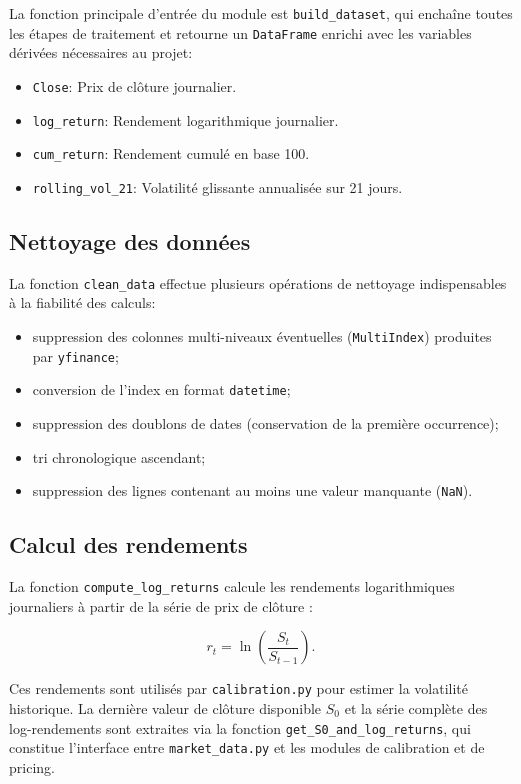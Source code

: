 \documentclass[11pt]{report}
\begin{document}
La fonction principale d'entrée du module est \texttt{build\_dataset}, qui enchaîne
toutes les étapes de traitement et retourne un \texttt{DataFrame} enrichi avec
les variables dérivées nécessaires au projet:

\begin{itemize}
    \item \texttt{Close}: Prix de clôture journalier.
    \item \texttt{log\_return}: Rendement logarithmique journalier.
    \item \texttt{cum\_return}: Rendement cumulé en base 100.
    \item \texttt{rolling\_vol\_21}: Volatilité glissante annualisée sur 21 jours.
\end{itemize}

\subsection{Nettoyage des données}

La fonction \texttt{clean\_data} effectue plusieurs opérations de nettoyage
indispensables à la fiabilité des calculs:

\begin{itemize}
    \item suppression des colonnes multi-niveaux éventuelles (\texttt{MultiIndex})
    produites par \texttt{yfinance};
    \item conversion de l'index en format \texttt{datetime};
    \item suppression des doublons de dates (conservation de la première occurrence);
    \item tri chronologique ascendant;
    \item suppression des lignes contenant au moins une valeur manquante (\texttt{NaN}).
\end{itemize}

\subsection{Calcul des rendements}

La fonction \texttt{compute\_log\_returns} calcule les rendements logarithmiques
journaliers à partir de la série de prix de clôture :

\[
r_t = \ln\!\left(\frac{S_t}{S_{t-1}}\right).
\]

Ces rendements sont utilisés par \texttt{calibration.py} pour estimer la volatilité
historique. La dernière valeur de clôture disponible $S_0$ et la série complète
des log-rendements sont extraites via la fonction \texttt{get\_S0\_and\_log\_returns},
qui constitue l'interface entre \texttt{market\_data.py} et les modules de
calibration et de pricing.
\end{document}
